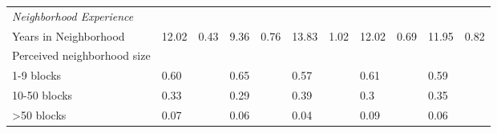 \begin{sidewaystable}[ht]
\begin{tabular}{lR{.4in}R{.4in}R{.4in}R{.4in}R{.4in}R{.4in}R{.4in}R{.4in}R{.4in}R{.4in}}
  \emph{Neighborhood Experience}\\Years in Neighborhood & 12.02 & 0.43 & 9.36 & 0.76 & 13.83 & 1.02 & 12.02 & 0.69 & 11.95 & 0.82 \\ 
  Perceived neighborhood size\\1-9 blocks &  0.60 &  & 0.65 &  & 0.57 &  & 0.61 &  & 0.59 &  \\ 
  10-50 blocks &  0.33 &  & 0.29 &  & 0.39 &  & 0.3 &  & 0.35 &  \\ 
  >50 blocks &  0.07 &  & 0.06 &  & 0.04 &  & 0.09 &  & 0.06 &  \\ 
   \bottomrule
\end{tabular}
\end{sidewaystable}
